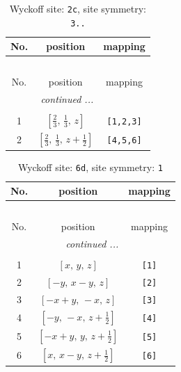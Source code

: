 \documentclass[fleqn,8pt]{jsarticle}
\begin{document}
\renewcommand{\arraystretch}{1.2}
\begin{longtable}{ccc}
\caption{Wyckoff site: {\tt 2c}, site symmetry: {\tt 3..}}
 \\
 \hline \hline
No. & position & mapping \\ \hline \endfirsthead

\multicolumn{2}{l}{\tablename\ \thetable{}} \\
 \hline \hline
No. & position & mapping \\ \hline \endhead

 \hline \hline
\multicolumn{2}{r}{\footnotesize\it continued ...} \\ \endfoot

 \hline \hline
\multicolumn{2}{r}{} \\ \endlastfoot

1 & $\left[ \frac{2}{3},\, \frac{1}{3},\, z \right]$ & {\tt [1,2,3]} \\ \hline
2 & $\left[ \frac{2}{3},\, \frac{1}{3},\, z + \frac{1}{2} \right]$ & {\tt [4,5,6]} \\
\end{longtable}
\renewcommand{\arraystretch}{1.2}
\begin{longtable}{ccc}
\caption{Wyckoff site: {\tt 6d}, site symmetry: {\tt 1}}
 \\
 \hline \hline
No. & position & mapping \\ \hline \endfirsthead

\multicolumn{2}{l}{\tablename\ \thetable{}} \\
 \hline \hline
No. & position & mapping \\ \hline \endhead

 \hline \hline
\multicolumn{2}{r}{\footnotesize\it continued ...} \\ \endfoot

 \hline \hline
\multicolumn{2}{r}{} \\ \endlastfoot

1 & $\left[ x,\, y,\, z \right]$ & {\tt [1]} \\ \hline
2 & $\left[ - y,\, x - y,\, z \right]$ & {\tt [2]} \\ \hline
3 & $\left[ - x + y,\, - x,\, z \right]$ & {\tt [3]} \\ \hline
4 & $\left[ - y,\, - x,\, z + \frac{1}{2} \right]$ & {\tt [4]} \\ \hline
5 & $\left[ - x + y,\, y,\, z + \frac{1}{2} \right]$ & {\tt [5]} \\ \hline
6 & $\left[ x,\, x - y,\, z + \frac{1}{2} \right]$ & {\tt [6]} \\
\end{longtable}
\end{document}
